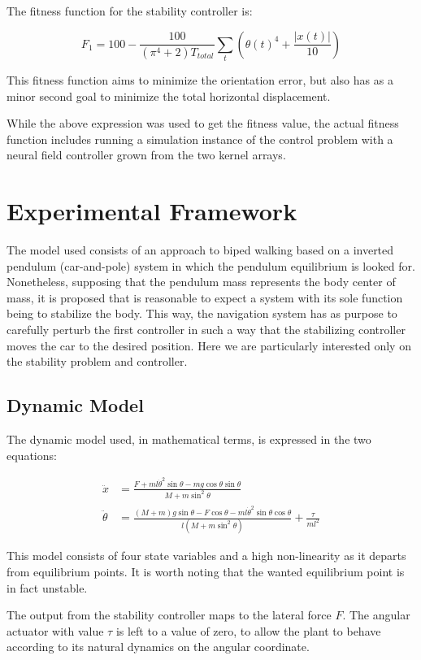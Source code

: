 The fitness function for the stability controller is:

\begin{equation}
  F_1=100-\frac{100}{(\pi^4+2)T_{total}}\sum_t{\left(\theta(t) ^4+\frac{|x(t)|}{10}\right)}
\end{equation}

This fitness function aims to minimize the orientation error, but also
has as a minor second goal to minimize the total horizontal
displacement.

While the above expression was used to get the fitness value, the
actual fitness function includes running a simulation instance of the
control problem with a neural field controller grown from the two
kernel arrays.

\section{Experimental Framework}
The model used consists of an approach to biped walking based on a
inverted pendulum (car-and-pole) system in which the pendulum
equilibrium is looked for. Nonetheless, supposing that the pendulum
mass represents the body center of mass, it is proposed that is
reasonable to expect a system with its sole function being to
stabilize the body. This way, the navigation system has as purpose to
carefully perturb the first controller in such a way that the
stabilizing controller moves the car to the desired position. Here we
are particularly interested only on the stability problem and
controller.

\subsection{Dynamic Model}
The dynamic model used, in mathematical terms, is expressed in the two
equations:

\begin{align}
  \ddot{x}&=\frac{F+ml\dot{\theta}^2\sin\theta-mg\cos\theta\sin\theta}{M+m\sin^2\theta}\\
  \ddot{\theta}&=\frac{(M+m)g\sin\theta-F\cos\theta-ml\dot{\theta}^2\sin\theta\cos\theta}{l(M+m\sin^2\theta)}+\frac{\tau}{ml^2}
\end{align}

This model consists of four state variables and a high non-linearity
as it departs from equilibrium points. It is worth noting that the
wanted equilibrium point is in fact unstable.

The output from the stability controller maps to the lateral force
$F$. The angular actuator with value $\tau$ is left to a value of
zero, to allow the plant to behave according to its natural dynamics
on the angular coordinate.

